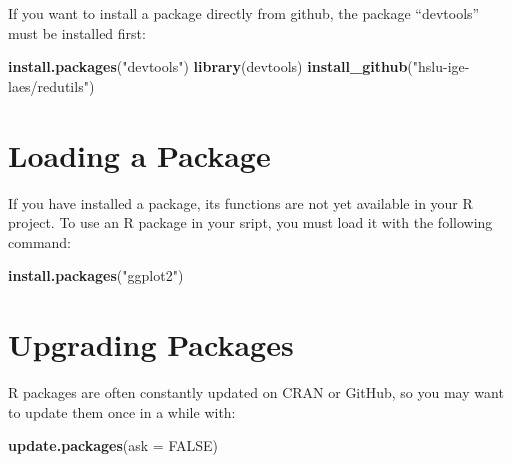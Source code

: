 \documentclass[
  a4paperpaper,
]{book}
\newenvironment{Shaded}{\begin{snugshade}}{\end{snugshade}}
\newcommand{\DataTypeTok}[1]{\textcolor[rgb]{0.13,0.29,0.53}{#1}}
\newcommand{\KeywordTok}[1]{\textcolor[rgb]{0.13,0.29,0.53}{\textbf{#1}}}
\newcommand{\NormalTok}[1]{#1}
\newcommand{\OtherTok}[1]{\textcolor[rgb]{0.56,0.35,0.01}{#1}}
\newcommand{\StringTok}[1]{\textcolor[rgb]{0.31,0.60,0.02}{#1}}
\let\oldShaded\Shaded
\let\endoldShaded\endShaded
\renewenvironment{Shaded}{\footnotesize\oldShaded}{\endoldShaded}
\begin{document}
If you want to install a package directly from github, the package ``devtools'' must be installed first:

\begin{Shaded}
\begin{Highlighting}[]
\KeywordTok{install.packages}\NormalTok{(}\StringTok{"devtools"}\NormalTok{)}
\KeywordTok{library}\NormalTok{(devtools)}
\KeywordTok{install_github}\NormalTok{(}\StringTok{"hslu-ige-laes/redutils"}\NormalTok{)}
\end{Highlighting}
\end{Shaded}

\newpage

\hypertarget{loading-a-package}{%
\section{Loading a Package}\label{loading-a-package}}

If you have installed a package, its functions are not yet available in your R project. To use an R package in your sript, you must load it with the following command:

\begin{Shaded}
\begin{Highlighting}[]
\KeywordTok{install.packages}\NormalTok{(}\StringTok{"ggplot2"}\NormalTok{)}
\end{Highlighting}
\end{Shaded}

\hypertarget{upgrading-packages}{%
\section{Upgrading Packages}\label{upgrading-packages}}

R packages are often constantly updated on CRAN or GitHub, so you may want to update them once in a while with:

\begin{Shaded}
\begin{Highlighting}[]
\KeywordTok{update.packages}\NormalTok{(}\DataTypeTok{ask =} \OtherTok{FALSE}\NormalTok{)}
\end{Highlighting}
\end{Shaded}
\end{document}
